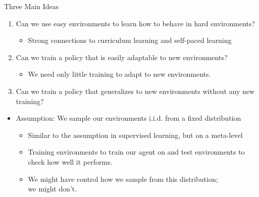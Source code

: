 \begin{frame}[c]{Three Main Ideas}
	
	\begin{enumerate}
		\item Can we use easy environments to learn how to behave in hard environments?
		\begin{itemize}
			\item Strong connections to curriculum learning and self-paced learning
		\end{itemize}
		\pause
		\item Can we train a policy that is easily adaptable to new environments?
		\begin{itemize}
			\item We need only little training to adapt to new environments.
		\end{itemize}
		\pause
		\item Can we train a policy that generalizes to new environments without any new training?
	\end{enumerate}

	\begin{itemize}
		\item Assumption: We sample our environments i.i.d. from a fixed distribution
		\begin{itemize}
			\item Similar to the assumption in supervised learning, but on a meta-level
			\item Training environments to train our agent on and test environments to check how well it performs.
			\item We might have control how we sample from this distribution;\\ we might don't.
		\end{itemize}
	\end{itemize}
			
\end{frame}

